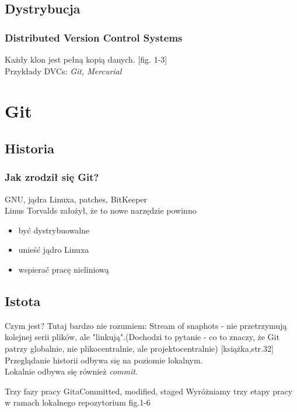 \documentclass{beamer}
\begin{document}
\subsection{Dystrybucja}
\begin{frame}
 \frametitle{\textbf{D}istributed \textbf{V}ersion \textbf{C}ontrol \textbf{S}ystems}
  Każdy klon jest pełną kopią danych.
  [fig. 1-3]
  \\Przykłady DVCs: \textit{Git, Mercurial}
\end{frame}

\section{Git}
\subsection{Historia}
\begin{frame}
 \frametitle{Jak zrodził się Git?}
GNU, jądra Linuxa, patches, BitKeeper \\
Linus Torvalds założył, że to nowe narzędzie powinno \\
  \begin{itemize}
  \item być dystrybuowalne
  \item unieść jądro Linuxa
  \item wspierać pracę nieliniową
 \end{itemize}
\end{frame}

\subsection{Istota}
\begin{frame}{Czym jest?}
 Tutaj bardzo nie rozumiem:
 Stream of snaphots - nie przetrzymują kolejnej serii plików, ale "linkują".(Dochodzi to pytanie - co to znaczy, że Git patrzy globalnie, nie plikocentralnie, ale projektocentralnie)
 [książka,str.32]\\
 Przeglądanie historii odbywa się na poziomie lokalnym.\\
 Lokalnie odbywa się również \textit{commit}.\\
\end{frame}

\begin{frame}{Trzy fazy pracy Gita}{Committed, modified, staged}
 Wyróżniamy trzy etapy pracy w ramach lokalnego repozytorium
 fig.1-6
\end{frame}
\end{document}
